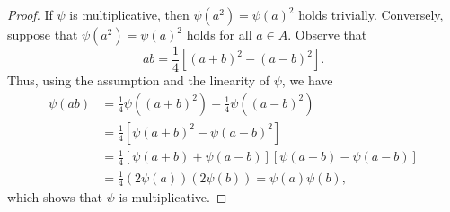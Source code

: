 \begin{proof}
	If $\psi$ is multiplicative, then $\psi(a^2)=\psi(a)^2$ holds trivially. Conversely, suppose that $\psi(a^2)=\psi(a)^2$ holds for all $a\in A$. Observe that
	\begin{equation*}
		ab = \frac{1}{4}[(a+b)^2-(a-b)^2].
	\end{equation*}
	Thus, using the assumption and the linearity of $\psi$, we have
	\begin{align*}
		\psi(ab) &= \frac{1}{4}\psi((a+b)^2) - \frac{1}{4}\psi((a-b)^2) \\
		&= \frac{1}{4}[\psi(a+b)^2-\psi(a-b)^2] \\
		&= \frac{1}{4}[\psi(a+b)+\psi(a-b)][\psi(a+b)-\psi(a-b)] \\
		&= \frac{1}{4}(2\psi(a))(2\psi(b)) = \psi(a)\psi(b),
	\end{align*}
	which shows that $\psi$ is multiplicative.
\end{proof}